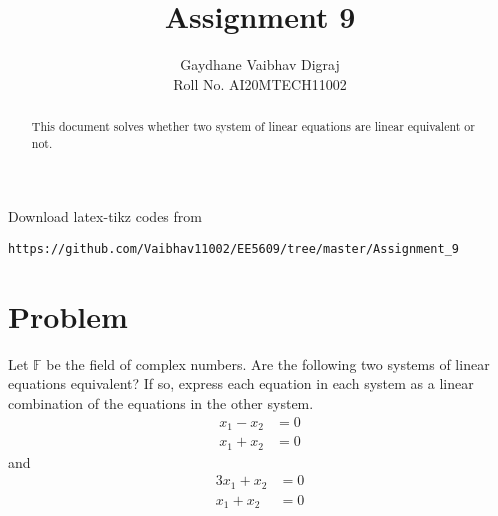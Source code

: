\documentclass[journal,12pt,twocolumn]{IEEEtran}
\begin{document}
     \def\rightbox#1{\makebox[0in][r]{#1}}
     \def\centbox#1{\makebox[0in]{#1}}
     \def\topbox#1{\raisebox{-\baselineskip}[0in][0in]{#1}}
     \def\midbox#1{\raisebox{-0.5\baselineskip}[0in][0in]{#1}}
\vspace{3cm}
\title{Assignment 9}
\author{Gaydhane Vaibhav Digraj \\ Roll No. AI20MTECH11002}
\maketitle
\newpage
\bigskip
\renewcommand{\thefigure}{\theenumi}
\renewcommand{\thetable}{\theenumi}
\begin{abstract}
This document solves whether two system of linear equations are linear equivalent or not.  
\end{abstract}
%
Download latex-tikz codes from 
%
\begin{lstlisting}
https://github.com/Vaibhav11002/EE5609/tree/master/Assignment_9
\end{lstlisting}
%
\section{Problem}
Let $\mathbb{F}$ be the field of complex numbers. Are the following two systems of linear equations equivalent? If so, express each equation in each system as a linear combination of the equations in the other system.
\begin{align*}
    x_1 - x_2 &=0\\
    x_1 + x_2 &=0
\end{align*}
and 
\begin{align*}
    3x_1 + x_2 &=0 \\
    x_1 + x_2 &=0
\end{align*}
\end{document}
